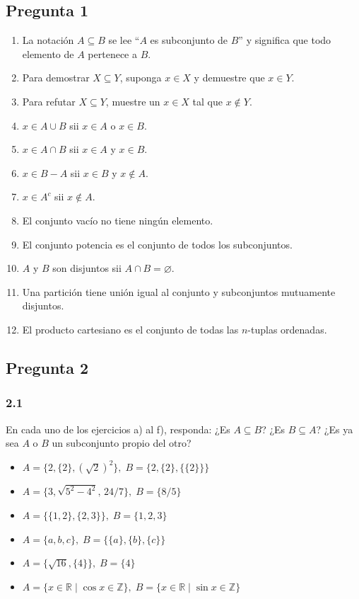 \documentclass[12pt,a4paper]{article}
\begin{document}
\subsection*{\textcolor{accent}{Pregunta 1}}
\begin{enumerate}[label=\arabic*.]
  \item La notación $A \subseteq B$ se lee ``$A$ es subconjunto de $B$'' y significa que todo elemento de $A$ pertenece a $B$.
  \item Para demostrar $X \subseteq Y$, suponga $x \in X$ y demuestre que $x \in Y$.
  \item Para refutar $X \subseteq Y$, muestre un $x \in X$ tal que $x \notin Y$.
  \item $x \in A \cup B$ sii $x \in A$ o $x \in B$.
  \item $x \in A \cap B$ sii $x \in A$ y $x \in B$.
  \item $x \in B - A$ sii $x \in B$ y $x \notin A$.
  \item $x \in A^c$ sii $x \notin A$.
  \item El conjunto vacío no tiene ningún elemento.
  \item El conjunto potencia es el conjunto de todos los subconjuntos.
  \item $A$ y $B$ son disjuntos sii $A \cap B = \varnothing$.
  \item Una partición tiene unión igual al conjunto y subconjuntos mutuamente disjuntos.
  \item El producto cartesiano es el conjunto de todas las $n$-tuplas ordenadas.
\end{enumerate}

\subsection*{\textcolor{accent}{Pregunta 2}}
\subsubsection*{2.1}
En cada uno de los ejercicios a) al f), responda: ¿Es $A \subseteq B$? ¿Es $B \subseteq A$? ¿Es ya sea $A$ o $B$ un subconjunto propio del otro?

\begin{itemize}[leftmargin=1.2em]
  \item[a.] $A = \{2,\{2\},(\sqrt{2})^2\},\; B=\{2,\{2\},\{\{2\}\}\}$
  \item[b.] $A = \{3,\sqrt{5^2-4^2},\,24/7\},\; B=\{8/5\}$
  \item[c.] $A = \{\{1,2\},\{2,3\}\},\; B=\{1,2,3\}$
  \item[d.] $A = \{a,b,c\},\; B=\{\{a\},\{b\},\{c\}\}$
  \item[e.] $A = \{\sqrt{16},\{4\}\},\; B=\{4\}$
  \item[f.] $A = \{x\in\mathbb{R}\mid\cos x\in\mathbb{Z}\},\; B=\{x\in\mathbb{R}\mid \sin x\in\mathbb{Z}\}$
\end{itemize}
\end{document}
